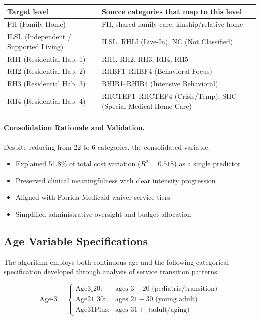 \begin{center}
\begin{tabular}{|l|p{10.5cm}|}
\hline
\textbf{Target level} & \textbf{Source categories that map to this level} \\
\hline
FH (Family Home) &
FH, shared family care, kinship/relative home \\
\hline
ILSL (Independent / Supported Living) &
ILSL, RHLI (Live-In), NC (Not Classified) \\
\hline
RH1 (Residential Hab. 1) &
RH1, RH2, RH3, RH4, RH5 \\
\hline
RH2 (Residential Hab. 2) &
RHBF1--RHBF4 (Behavioral Focus) \\
\hline
RH3 (Residential Hab. 3) &
RHIB1--RHIB4 (Intensive Behavioral) \\
\hline
RH4 (Residential Hab. 4) &
RHCTEP1--RHCTEP4 (Crisis/Temp), SHC (Special Medical Home Care) \\
\hline
\end{tabular}
\end{center}

\paragraph{Consolidation Rationale and Validation.}
Despite reducing from 22 to 6 categories, the consolidated variable:
\begin{itemize}
    \item Explained 51.8\% of total cost variation ($R^2 = 0.518$) as a single predictor
    \item Preserved clinical meaningfulness with clear intensity progression
    \item Aligned with Florida Medicaid waiver service tiers
    \item Simplified administrative oversight and budget allocation
\end{itemize}

\subsection{Age Variable Specifications}

The algorithm employs both continuous age and the following categorical specification developed through analysis of service transition patterns:

\begin{equation}
\text{Age-3} = \begin{cases}
\text{Age3\_20}: & \text{ages } 3-20 \text{ (pediatric/transition)} \\
\text{Age21\_30}: & \text{ages } 21-30 \text{ (young adult)} \\
\text{Age31Plus}: & \text{ages } 31+ \text{ (adult/aging)}
\end{cases}
\end{equation}

